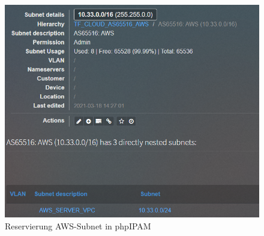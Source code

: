 \begin{figure}[h]
  \centering
  \includegraphics[scale=0.8]{Figures/subnet_aws_ipam_server.png}
  \caption{Reservierung AWS-Subnet in phpIPAM}
  \label{grafik:subnet_aws_vpc_ipam_reserved}
\end{figure}\FloatBarrier

